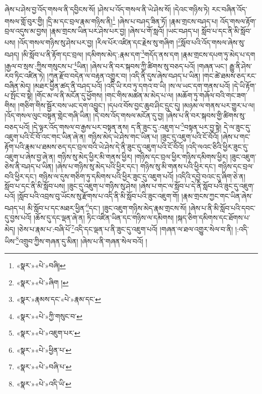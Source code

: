 ཞེས་པ་ཤེས་བྱ་འོད་གསལ་ནི་དབྱིངས་སོ། །ཤེས་པ་འོད་གསལ་ནི་ཡེ་ཤེས་སོ། །དེའང་གཉིས་ཏེ། རང་བཞིན་འོད་གསལ་གློ་བུར་གྱི། །དྲི་མ་དང་བྲལ་རྣམ་གཉིས་ནི།\footnote{«སྣར་»«པེ་»བཞི།} །ཞེས་པ་བཤད་ཟིན་ཏོ། །རྣམ་གྲངས་བཤད་པ། འོད་གསལ་རྟོག་བྲལ་འདུས་མ་བྱས། །རྣམ་གྲངས་ཡིན་པར་ཤེས་པར་བྱ། །ཞེས་པ་གོ་སླའོ། །ཡང་བཤད་པ། སློབ་པ་དང་ནི་མི་སློབ་པས། །འོད་གསལ་གཉིས་སུ་ཤེས་པར་བྱ། །རིལ་པོར་འཛིན་དང་རྗེས་སུ་གཞིག །\footnote{«སྣར་»«པེ་»ཞིག །}སློབ་པའི་འོད་གསལ་ཞེས་སུ་བཤད། །མི་སློབ་པ་ནི་རྟོག་དང་བྲལ། །དམིགས་མེད་:རྣམ་དག་\footnote{«སྣར་»རྣམས་དང་«པེ་»རྣམ་དང་}གདོད་ནས་དག །རྣམ་གྲངས་དཔག་ཏུ་མེད་པ་དག །རྒྱལ་བ་སྲས་:ཀྱིས་གསུངས་པ་\footnote{«སྣར་»«པེ་»ཀྱི་གསུང་བ་}ཡིན། །ཞེས་པ་ནི་བར་སྐབས་ཀྱི་ཚིགས་སུ་བཅད་པའོ། །གཞན་ཡང་། རྒྱུ་ནི་ཤེས་རབ་ཏིང་འཛིན་ཏེ། །ཀུན་རྫོབ་བདེན་ལ་བརྟན་འགྱུར་བ། །འདི་ནི་དུས་ཞེས་བཤད་པ་ཡིན། །གང་ཚེ་ཐམས་ཅད་རང་བཞིན་མེད། །མཐར་ཕྱིན་ཚད་ནི་བཤད་པའོ། །འདི་ཡི་རབ་ཏུ་དགའ་བ་ཡི། །ས་ལ་ཡང་དག་གནས་པའོ། །དེ་ཡི་རྟོག་པ་སྤོང་བ་སྟེ། །གོང་མ་ལ་ནི་མངོན་དུ་ཕྱོགས། །གང་གིས་མཚན་མ་མེད་པ་ལ། །མཆོག་ཏུ་གཞོལ་བའི་གང་ཟག་གིས། །གཅིག་གིས་སྦྱོར་བས་ཡང་དག་འབྱུང་། །དཔའ་བོས་བྱང་ཆུབ་ཤིང་དྲུང་དུ། །མཉམ་ལ་གནས་པར་གྱུར་པ་ལ། །འོད་གསལ་ལུང་བསྟན་གླེང་གཞི་ཡིན། །དེ་བས་འོད་གསལ་མངོན་དུ་བྱ། །ཞེས་པ་ནི་བར་སྐབས་གྱི་ཚིགས་སུ་བཅད་པའོ། །དེ་ལྟར་འོད་གསལ་བ་རྒྱས་པར་བསྟན་ནས། ད་ནི་ཟུང་དུ་:འཇུག་པ་\footnote{«སྣར་»«པེ་»འཇུག་པར་}བསྟན་པར་བྱ་སྟེ། དེ་ལ་ཟུང་དུ་འཇུག་པའི་ངོ་བོ་འང་གང་ཡིན་ཞེ་ན། གཉིས་མེད་ཡེ་ཤེས་གང་ཡིན་པ། །ཟུང་དུ་འཇུག་པའི་ངོ་བོའོ། །ཞེས་པ་གང་རྟོག་པའི་རྣམ་པ་ཐམས་ཅད་དང་བྲལ་བའི་ཡེ་ཤེས་དེ་ནི་ཟུང་དུ་འཇུག་པའི་ངོ་བོའོ། །འདི་ལའང་ཅིའི་ཕྱིར་ཟུང་དུ་འཇུག་པ་ཞེས་བྱ་ཞེ་ན། གཉིས་སུ་མེད་ཕྱིར་མི་གནས་ཕྱིར། །གཉིས་དང་བྲལ་ཕྱིར་གཉིས་དམིགས་ཕྱིར། །ཟུང་འཇུག་ཅེས་ནི་བཤད་པ་ཡིན། །ཞེས་པ་གཉིས་སུ་མེད་པའི་ཕྱིར་དང་། གཉིས་སུ་མི་གནས་པའི་ཕྱིར་དང་། གཉིས་དང་བྲལ་བའི་ཕྱིར་དང་། གཉིས་ལ་དུས་གཅིག་ཏུ་དམིགས་པའི་ཕྱིར་ཟུང་དུ་འཇུག་པའོ། །འདིའི་དབྱེ་བའང་དུ་ཞིག་ཅེ་ན། སློབ་པ་དང་ནི་མི་སློབ་པས། །ཟུང་དུ་འཇུག་པ་གཉིས་སུ་ཤེས། །ཞེས་པ་གང་ལ་སློབ་པ་དེ་ནི་སློབ་པའི་ཟུང་དུ་འཇུག་པའོ། །སློབ་པའི་འབྲས་བུ་ཡོངས་སུ་རྫོགས་པ་འདི་ནི་མི་སློབ་པའི་ཟུང་འཇུག་གོ། །རྣམ་གྲངས་ཀྱང་གང་ཡིན་ཞེས་བཤད་པ། མི་སློབ་པ་དང་མཐར་ཕྱིན་\footnote{«སྣར་»«པེ་»ཕྱིན་པ་}དང་། །ཟུང་འཇུག་གཉིས་མེད་རྣམ་གྲངས་སོ། །ཞེས་པ་ནི་མི་སློབ་པའི་དབང་དུ་བྱས་པའོ། །ཆོས་དུ་དང་ལྡན་ཞེ་ན། ཏིང་འཛིན་ཡིན་དང་གཉིས་ལ་དམིགས། །སྐད་ཅིག་དམིགས་དང་ཐོགས་པ་མེད། །ཅེས་པ་རྣམ་པ་:བཞི་པོ་\footnote{«སྣར་»«པེ་»བཞི་པ་}འདི་དང་ལྡན་པ་ནི་ཟུང་དུ་འཇུག་པའོ། །གཞན་ལ་ཐལ་འགྱུར་སེལ་བ་ནི། །:འདི་ཡིས་\footnote{«སྣར་»«པེ་»འདི་ཡི་}འགྲུབ་ཀྱིས་གཞན་དུ་མིན། །ཞེས་པ་ནི་གཞན་སེལ་བའོ། །
